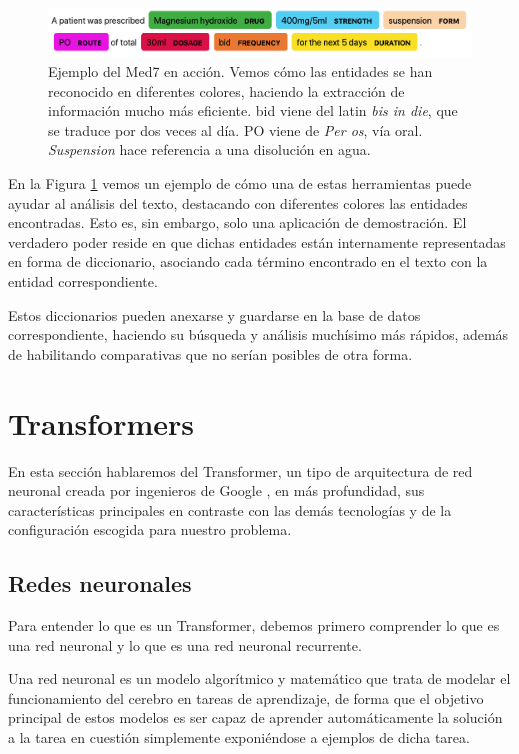 \begin{figure}[h]
	\centering
	\includegraphics[width=.9\textwidth]{media/med7_example.png}
	\caption{Ejemplo del Med7 en acción. Vemos cómo las entidades se han reconocido en diferentes colores, haciendo la extracción de información mucho más eficiente. bid viene del latin \textit{bis in die}, que se traduce por dos veces al día. PO viene de \textit{Per os}, vía oral. \textit{Suspension} hace referencia a una disolución en agua.}
	\label{fig:med7}
\end{figure}

En la Figura \ref{fig:med7} vemos un ejemplo de cómo una de estas herramientas puede ayudar al análisis del texto, destacando con diferentes colores las entidades encontradas. Esto es, sin embargo, solo una aplicación de demostración. El verdadero poder reside en que dichas entidades están internamente representadas en forma de diccionario, asociando cada término encontrado en el texto con la entidad correspondiente. 

Estos diccionarios pueden anexarse y guardarse en la base de datos correspondiente, haciendo su búsqueda y análisis muchísimo más rápidos, además de habilitando comparativas que no serían posibles de otra forma.

\section{Transformers}
En esta sección hablaremos del Transformer, un tipo de arquitectura de red neuronal creada por ingenieros de Google \cite{TransformerAshish2017}, en más profundidad, sus características principales en contraste con las demás tecnologías y de la configuración escogida para nuestro problema.

\subsection{Redes neuronales}
Para entender lo que es un Transformer, debemos primero comprender lo que es una red neuronal y lo que es una red neuronal recurrente.

Una red neuronal es un modelo algorítmico y matemático que trata de modelar el funcionamiento del cerebro en tareas de aprendizaje, de forma que el objetivo principal de estos modelos es ser capaz de aprender automáticamente la solución a la tarea en cuestión simplemente exponiéndose a ejemplos de dicha tarea.

